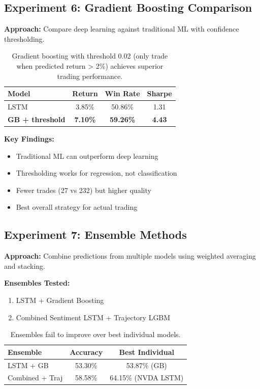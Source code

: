 \documentclass[10pt,twocolumn]{article}
\begin{document}
\subsection{Experiment 6: Gradient Boosting Comparison}

\textbf{Approach:} Compare deep learning against traditional ML with confidence thresholding.

\begin{table}[h]
\centering
\small
\begin{tabular}{lccc}
\toprule
Model & Return & Win Rate & Sharpe \\
\midrule
LSTM & 3.85\% & 50.86\% & 1.31 \\
\textbf{GB + threshold} & \textbf{7.10\%} & \textbf{59.26\%} & \textbf{4.43} \\
\bottomrule
\end{tabular}
\caption{Gradient boosting with threshold 0.02 (only trade when predicted return > 2\%) achieves superior trading performance.}
\end{table}

\textbf{Key Findings:}
\begin{itemize}
\item Traditional ML can outperform deep learning
\item Thresholding works for regression, not classification
\item Fewer trades (27 vs 232) but higher quality
\item Best overall strategy for actual trading
\end{itemize}

\subsection{Experiment 7: Ensemble Methods}

\textbf{Approach:} Combine predictions from multiple models using weighted averaging and stacking.

\textbf{Ensembles Tested:}
\begin{enumerate}
\item LSTM + Gradient Boosting
\item Combined Sentiment LSTM + Trajectory LGBM
\end{enumerate}

\begin{table}[h]
\centering
\small
\begin{tabular}{lcc}
\toprule
Ensemble & Accuracy & Best Individual \\
\midrule
LSTM + GB & 53.30\% & 53.87\% (GB) \\
Combined + Traj & 58.58\% & 64.15\% (NVDA LSTM) \\
\bottomrule
\end{tabular}
\caption{Ensembles fail to improve over best individual models.}
\end{table}
\end{document}
